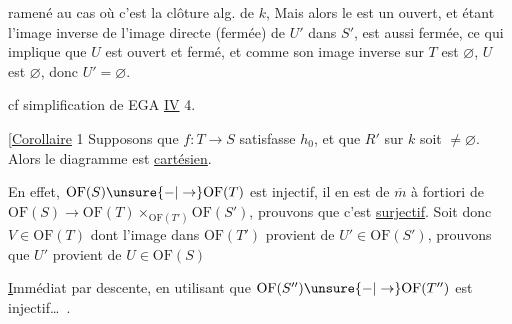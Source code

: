 ramené au cas où c'est la clôture alg. de $k$, Mais alors  le   est un ouvert, et étant l'image inverse de l'image directe (fermée)  de $U'$ dans $S'$, est aussi fermée, ce qui implique que $U$ est  ouvert et fermé, et comme son image inverse sur $T$ est $\varnothing$, $U$ est $\varnothing$, donc $U'=\varnothing$.

cf simplification  de EGA \uline{IV} 4.

[\uline{Corollaire} 1 Supposons que $f:T\to S$ satisfasse $h_0$, et que $R'$ sur $k$ soit $\ne\varnothing$. Alors le diagramme
est \uline{cartésien}.

En effet, $\mathrm{OF}(S)\unsure{-|\to}\mathrm{OF}(T)$ est injectif, il en est de $\overline m$ à fortiori de $\mathrm{OF}(S)\to\mathrm{OF}(T)\times_{\mathrm{OF}(T')}\mathrm{OF}(S')$, prouvons que c'est \uline{surjectif}. Soit donc $V\in\mathrm{OF}(T)$ dont l'image dans $\mathrm{OF}(T')$ provient de $U'\in\mathrm{OF}(S')$, prouvons que $U'$ provient de $U\in\mathrm{OF}(S)$

\uline{I}mmédiat par descente, en utilisant que $\mathrm{OF}(S'')\unsure{-|\to}\mathrm{OF}(T'')$ est injectif\ldots\ .
